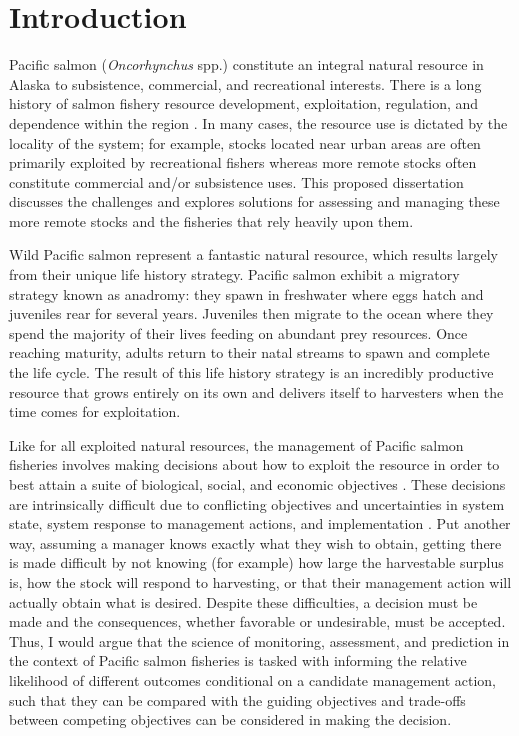 \documentclass[12pt,]{book}
\theoremstyle{definition}
\theoremstyle{definition}
\theoremstyle{definition}
\theoremstyle{remark}
\begin{document}
\setlength{\parskip}{0pt plus 0pt minus 0pt}

\doublespacing

\chapter{Introduction}\label{ch1}

\noindent
Pacific salmon (\emph{Oncorhynchus} spp.) constitute an integral natural
resource in Alaska to subsistence, commercial, and recreational
interests. There is a long history of salmon fishery resource
development, exploitation, regulation, and dependence within the region
\citep{cooley-1963}. In many cases, the resource use is dictated by the
locality of the system; for example, stocks located near urban areas are
often primarily exploited by recreational fishers whereas more remote
stocks often constitute commercial and/or subsistence uses. This
proposed dissertation discusses the challenges and explores solutions
for assessing and managing these more remote stocks and the fisheries
that rely heavily upon them.

Wild Pacific salmon represent a fantastic natural resource, which
results largely from their unique life history strategy. Pacific salmon
exhibit a migratory strategy known as anadromy: they spawn in freshwater
where eggs hatch and juveniles rear for several years. Juveniles then
migrate to the ocean where they spend the majority of their lives
feeding on abundant prey resources. Once reaching maturity, adults
return to their natal streams to spawn and complete the life cycle. The
result of this life history strategy is an incredibly productive
resource that grows entirely on its own and delivers itself to
harvesters when the time comes for exploitation.

Like for all exploited natural resources, the management of Pacific
salmon fisheries involves making decisions about how to exploit the
resource in order to best attain a suite of biological, social, and
economic objectives \citep{walters-1986}. These decisions are
intrinsically difficult due to conflicting objectives and uncertainties
in system state, system response to management actions, and
implementation \citep{walters-holling-1990}. Put another way, assuming a
manager knows exactly what they wish to obtain, getting there is made
difficult by not knowing (for example) how large the harvestable surplus
is, how the stock will respond to harvesting, or that their management
action will actually obtain what is desired. Despite these difficulties,
a decision must be made \citep[without decision-making there is no
management;][]{hilborn-walters-1992} and the consequences, whether
favorable or undesirable, must be accepted. Thus, I would argue that the
science of monitoring, assessment, and prediction in the context of
Pacific salmon fisheries is tasked with informing the relative
likelihood of different outcomes conditional on a candidate management
action, such that they can be compared with the guiding objectives and
trade-offs between competing objectives can be considered in making the
decision.
\end{document}
